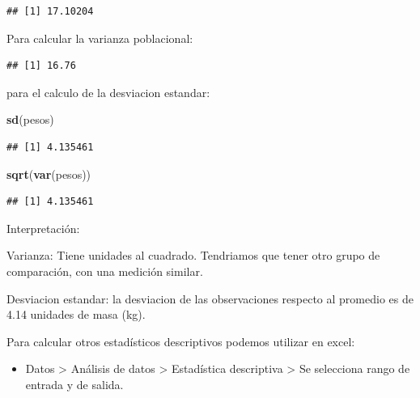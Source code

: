 \documentclass[twocolumn]{article}
\newenvironment{Shaded}{\begin{snugshade}}{\end{snugshade}}
\newcommand{\KeywordTok}[1]{\textcolor[rgb]{0.13,0.29,0.53}{\textbf{#1}}}
\newcommand{\DecValTok}[1]{\textcolor[rgb]{0.00,0.00,0.81}{#1}}
\newcommand{\StringTok}[1]{\textcolor[rgb]{0.31,0.60,0.02}{#1}}
\newcommand{\OperatorTok}[1]{\textcolor[rgb]{0.81,0.36,0.00}{\textbf{#1}}}
\newcommand{\NormalTok}[1]{#1}
\providecommand{\tightlist}{%
  \setlength{\itemsep}{0pt}\setlength{\parskip}{0pt}}
\begin{document}
\begin{verbatim}
## [1] 17.10204
\end{verbatim}

Para calcular la varianza poblacional:

\begin{Shaded}
\end{Shaded}

\begin{verbatim}
## [1] 16.76
\end{verbatim}

para el calculo de la desviacion estandar:

\begin{Shaded}
\begin{Highlighting}[]
\KeywordTok{sd}\NormalTok{(pesos)}
\end{Highlighting}
\end{Shaded}

\begin{verbatim}
## [1] 4.135461
\end{verbatim}

\begin{Shaded}
\begin{Highlighting}[]
\KeywordTok{sqrt}\NormalTok{(}\KeywordTok{var}\NormalTok{(pesos))}
\end{Highlighting}
\end{Shaded}

\begin{verbatim}
## [1] 4.135461
\end{verbatim}

Interpretación:

Varianza: Tiene unidades al cuadrado. Tendriamos que tener otro grupo de
comparación, con una medición similar.

Desviacion estandar: la desviacion de las observaciones respecto al
promedio es de 4.14 unidades de masa (kg).

Para calcular otros estadísticos descriptivos podemos utilizar en excel:

\begin{itemize}
\tightlist
\item
  Datos \textgreater{} Análisis de datos \textgreater{} Estadística
  descriptiva \textgreater{} Se selecciona rango de entrada y de salida.
\end{itemize}
\end{document}
